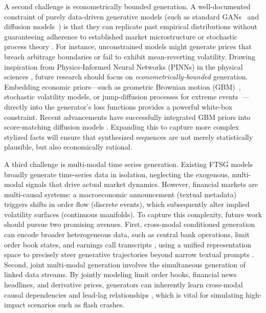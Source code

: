 A second challenge is econometrically bounded generation. A well-documented constraint of purely data-driven generative models (such as standard GANs~\citep{goodfellow2014gan} and diffusion models~\citep{ho2020ddpm,song2021score}) is that they can replicate past empirical distributions without guaranteeing adherence to established market microstructure or stochastic process theory \citep{cont2001empirical}. For instance, unconstrained models might generate prices that breach arbitrage boundaries or fail to exhibit mean-reverting volatility.
Drawing inspiration from Physics-Informed Neural Networks (PINNs) in the physical sciences \citep{raissi2019physics}, future research should focus on \textit{econometrically-bounded} generation. Embedding economic priors---such as geometric Brownian motion (GBM)~\citep{black1973pricing}, stochastic volatility models, or jump-diffusion processes for extreme events~\citep{merton1976option}---directly into the generator's loss functions provides a powerful white-box constraint. Recent advancements have successfully integrated GBM priors into score-matching diffusion models \citep{tanaka2025cofindiff}. Expanding this to capture more complex stylized facts will ensure that synthesized sequences are not merely statistically plausible, but also economically rational.

A third challenge is multi-modal time series generation. Existing FTSG models broadly generate time-series data in isolation, neglecting the exogenous, multi-modal signals that drive actual market dynamics. However, financial markets are multi-causal systems: a macroeconomic announcement (textual metadata) triggers shifts in order flow (discrete events), which subsequently alter implied volatility surfaces (continuous manifolds). To capture this complexity, future work should pursue two promising avenues. First, cross-modal conditioned generation can encode broader heterogeneous data, such as central bank operations, limit order book states, and earnings call transcripts \cite{T2S, wang2024mtsisurvey}, using a unified representation space to precisely steer generative trajectories beyond narrow textual prompts \cite{jin2024timellm, liu2025calf}. Second, joint multi-modal generation involves the simultaneous generation of linked data streams. By jointly modeling limit order books, financial news headlines, and derivative prices, generators can inherently learn cross-modal causal dependencies and lead-lag relationships \cite{T2S}, which is vital for simulating high-impact scenarios such as flash crashes.

